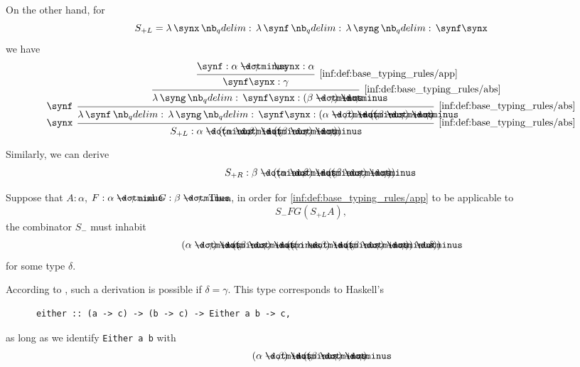 \begin{example}
\begin{thmenum}
    On the other hand, for
    \begin{equation*}
      S_{+L} = \qabs \synx \qabs \synf \qabs \syng \synf \synx
    \end{equation*}
    we have
    \begin{equation*}
      \begin{prooftree}
        \hypo{ \synf: \alpha \synimplies \gamma }
        \hypo{ \synx: \alpha }
        \infer2[\ref{inf:def:base_typing_rules/app}]{ \synf \synx: \gamma }
        \infer1[\ref{inf:def:base_typing_rules/abs}]{ \qabs \syng \synf \synx: (\beta \synimplies \gamma) \synimplies \gamma }
        \infer[left label=\( \synf \)]1[\ref{inf:def:base_typing_rules/abs}]{ \qabs \synf \qabs \syng \synf \synx: (\alpha \synimplies \beta) \synimplies ((\beta \synimplies \gamma) \synimplies \gamma) }
        \infer[left label=\( \synx \)]1[\ref{inf:def:base_typing_rules/abs}]{ S_{+L}: \alpha \synimplies ((\alpha \synimplies \beta) \synimplies ((\beta \synimplies \gamma) \synimplies \gamma)) }
      \end{prooftree}
    \end{equation*}

    Similarly, we can derive
    \begin{equation*}
      S_{+R}: \beta \synimplies ((\alpha \synimplies \beta) \synimplies ((\beta \synimplies \gamma) \synimplies \gamma)).
    \end{equation*}

    Suppose that \( A: \alpha \), \( F: \alpha \synimplies \gamma \) and \( G: \beta \synimplies \gamma \). Then, in order for \ref{inf:def:base_typing_rules/app} to be applicable to
    \begin{equation*}
      S_- F G (S_{+L} A),
    \end{equation*}
    the combinator \( S_- \) must inhabit
    \begin{equation*}
      (\alpha \synimplies \gamma) \synimplies ((\beta \synimplies \gamma) \synimplies (((\alpha \synimplies \beta) \synimplies ((\beta \synimplies \gamma) \synimplies \gamma)) \synimplies \delta))
    \end{equation*}
    for some type \( \delta \).

    According to , such a derivation is possible if \( \delta = \gamma \). This type corresponds to Haskell's
    \begin{verbatim}
      either :: (a -> c) -> (b -> c) -> Either a b -> c,
    \end{verbatim}\vspace{-\baselineskip}
    as long as we identify \verb|Either a b| with
    \begin{equation*}
      (\alpha \synimplies \beta) \synimplies ((\beta \synimplies \gamma) \synimplies \gamma).
    \end{equation*}


\end{thmenum}
\end{example}
